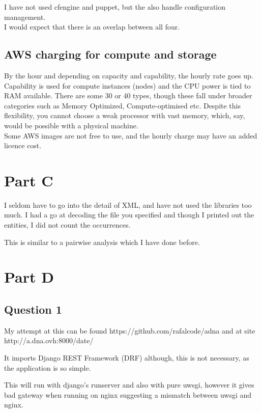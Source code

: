 \documentclass[14pt]{article}
\begin{document}
I have not used cfengine and puppet, but the also handle configuration management. \\

I would expect that there is an overlap between all four.

\subsection*{AWS charging for compute and storage}

By the hour and depending on capacity and capability, the hourly rate goes up. Capability is used for compute instances (nodes) and the CPU power is tied to RAM available. There are some 30 or 40 types, though these fall under broader categories such as Memory Optimized, Compute-optimised etc. Despite this flexibility, you cannot choose a weak processor with vast memory, which, say, would be possible with a physical machine. \\

Some AWS images are not free to use, and the hourly charge may have an added licence cost. \\

\section*{Part C}

I seldom have to go into the detail of XML, and have not used the libraries too much. I had a go at decoding the file you specified
and though I printed out the entities, I did not count the occurrences.

This is similar to a pairwise analysis which I have done before.

\section*{Part D}

\subsection*{Question 1}

My attempt at this can be found https://github.com/rafalcode/adna and at site http://a.dna.ovh:8000/date/

It imports Django REST Framework (DRF) although, this is not necessary, as the application is so simple.

This will run with django's runserver  and also with pure uwsgi, however it gives bad gateway when running on nginx
suggesting a mismatch between uwsgi and nginx.
\end{document}
